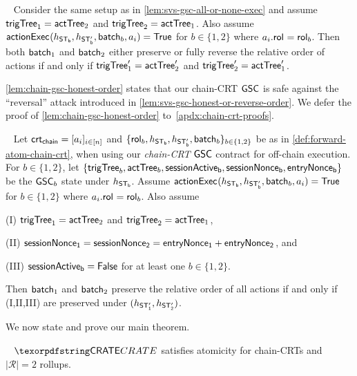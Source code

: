 \begin{lemma}~\label{lem:svs-gsc-honest-or-reverse-order}
    Consider the same setup as in \cref{lem:svs-gsc-all-or-none-exec} and assume $\mathsf{trigTree}_1 = \mathsf{actTree}_2$ and $\mathsf{trigTree}_2 = \mathsf{actTree}_1$. Also assume $\mathsf{actionExec}_{}(h_{\mathsf{ST_{b}}}, h_{\mathsf{ST_{b}'}}, \mathsf{batch}_{b}, a_i) = \mathsf{True}$ for $b \in \{1,2\}$ where $a_i.\mathsf{rol}_{} = \mathsf{rol}_{b}$. Then both $\mathsf{batch}_{1}$ and $\mathsf{batch}_{2}$ either preserve or fully reverse the relative order of actions if and only if $\mathsf{trigTree}_1' = \mathsf{actTree}_2'$ and $\mathsf{trigTree}_2' = \mathsf{actTree}_1'$.
\end{lemma}


\cref{lem:chain-gsc-honest-order} states that our chain-CRT $\mathsf{GSC}$ is safe against the ``reversal'' attack introduced in \cref{lem:svs-gsc-honest-or-reverse-order}. We defer the proof of \cref{lem:chain-gsc-honest-order} to~\cref{apdx:chain-crt-proofs}. 

\begin{lemma}~\label{lem:chain-gsc-honest-order}
    Let $\mathsf{crt_{chain}} = [a_i]_{i \in [n]}$ and $\{\mathsf{rol}_{b}, h_{\mathsf{ST_{b}}}, h_{\mathsf{ST_{b}'}}, \mathsf{batch}_{b}\}_{b \in \{1,2\}}$ be as in \cref{def:forward-atom-chain-crt}, when using our \emph{chain-CRT} $\mathsf{GSC}$ contract for off-chain execution. For $b \in \{1,2\}$, let $\{\mathsf{trigTree}_b, \mathsf{actTree}_b, \mathsf{sessionActive_{b}}, \mathsf{sessionNonce_{b}},  \\ \mathsf{entryNonce_{b}} \}$ be the $\mathsf{GSC}_b$ state under $h_{\mathsf{ST_{b}}}$. Assume $\mathsf{actionExec}_{}(h_{\mathsf{ST_{b}}}, h_{\mathsf{ST_{b}'}}, \mathsf{batch}_{b}, a_i) = \mathsf{True}$ for $b \in \{1,2\}$ where $a_i.\mathsf{rol}_{} = \mathsf{rol}_{b}$. Also assume 

    \noindent(I) $\mathsf{trigTree}_1 = \mathsf{actTree}_2$ and $\mathsf{trigTree}_2 = \mathsf{actTree}_1$,
    
    \noindent(II) $\mathsf{sessionNonce_{1}} = \mathsf{sessionNonce_{2}} = \mathsf{entryNonce_{1}} + \mathsf{entryNonce_{2}}$, and

    \noindent(III) $\mathsf{sessionActive_{b}} = \mathsf{False}$ for at least one $b \in \{1,2\}$.

    \noindent Then $\mathsf{batch}_{1}$ and $\mathsf{batch}_{2}$ preserve the relative order of all actions if and only if (I,II,III) are preserved under $(h_{\mathsf{ST_{1}'}}, h_{\mathsf{ST_{2}'}})$.
\end{lemma}

We now state and prove our main theorem.


\begin{theorem}~\label{thm:chain-crate-forward-atomicity-two-rollups}
    $\pname$ satisfies atomicity for chain-CRTs and $|\mathcal{R}| = 2$ rollups.
\end{theorem}

